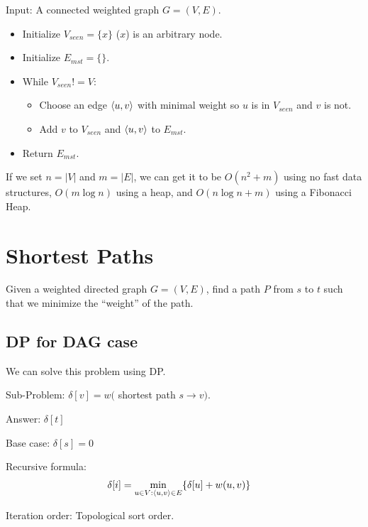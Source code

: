             Input: A connected weighted graph $G = (V, E)$.
            \begin{itemize}
                \item Initialize $V_{seen} = \{x\}$ ($x$) is an arbitrary node.
                \item Initialize $E_{mst} = \{\}$.
                \item While $V_{seen} != V$:
                    \begin{itemize}
                        \item Choose an edge $\left \langle u,v \right \rangle $ with minimal weight
                        so $u$ is in $V_{seen}$ and $v$ is not.
                        \item Add $v$ to $V_{seen}$ and $\left \langle u, v \right \rangle $
                        to $E_{mst}$.
                    \end{itemize}

                \item Return $E_{mst}$.
            \end{itemize}

            If we set $n = |V|$ and $m = |E|$, we can get it to be $O(n^2 + m)$
            using no fast data structures, $O(m \log n)$ using a heap, and
            $O(n \log n + m)$ using a Fibonacci Heap.

    \section{Shortest Paths}
        Given a weighted directed graph $G = (V, E)$, find a path $P$ from $s$
        to $t$ such that we minimize the ``weight'' of the path.
        \subsection{DP for DAG case}
            We can solve this problem using DP.

            Sub-Problem: $\delta[v] = w($ shortest path $s \to v)$.

            Answer: $\delta[t]$

            Base case: $\delta[s] = 0$

            Recursive formula:
            \begin{align*}
                \delta[i] &= \min_{u \in V : \left \langle u,v \right \rangle  \in E} \{ \delta[u] + w(u,v)\}
            \end{align*}

            Iteration order: Topological sort order.

